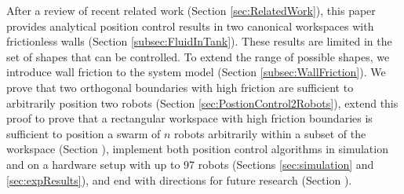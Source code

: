 After a review of recent related work (Section \ref{sec:RelatedWork}), this paper provides analytical position control results in two canonical workspaces with frictionless walls (Section \ref{subsec:FluidInTank}).  These results are limited in the set of shapes that can be controlled.  To extend the range of possible shapes, we introduce wall friction to the system model (Section \ref{subsec:WallFriction}).  We prove that two orthogonal boundaries with high friction are sufficient to arbitrarily position two robots (Section \ref{sec:PostionControl2Robots}), extend this proof to prove that a rectangular workspace with high friction boundaries is sufficient to position a swarm of $n$ robots arbitrarily within a subset of the workspace (Section \label{sec:PostionControlnRobots}), implement both position control algorithms in simulation and on a hardware setup with up to 97 robots (Sections \ref{sec:simulation} and \ref{sec:expResults}), and end with directions for future research (Section )\label{sec:conclusion}.

